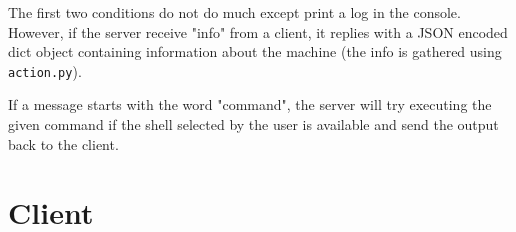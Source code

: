 \documentclass{article}
\begin{document}
The first two conditions do not do much except print a log in the console.
However, if the server receive "info" from a client, it replies with a JSON
encoded dict object containing information about the machine (the info is
gathered using \verb|action.py|). 

If a message starts with the word "command", the server will try executing the
given command if the shell selected by the user is available and send the output
back to the client.
\section{Client}
\end{document}
